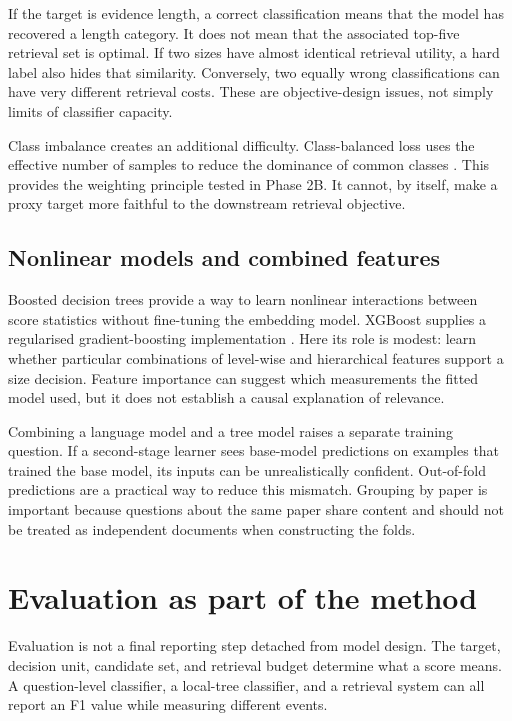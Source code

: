 If the target is evidence length, a correct classification means that
the model has recovered a length category. It does not mean that the
associated top-five retrieval set is optimal. If two sizes have almost
identical retrieval utility, a hard label also hides that similarity.
Conversely, two equally wrong classifications can have very different
retrieval costs. These are objective-design issues, not simply limits
of classifier capacity.

Class imbalance creates an additional difficulty. Class-balanced loss
uses the effective number of samples to reduce the dominance of common
classes \cite{cui2019classbalanced}. This provides the weighting
principle tested in Phase 2B. It cannot, by itself, make a proxy target
more faithful to the downstream retrieval objective.

\subsection{Nonlinear models and combined features}
Boosted decision trees provide a way to learn nonlinear interactions
between score statistics without fine-tuning the embedding model.
XGBoost supplies a regularised gradient-boosting implementation
\cite{chen2016xgboost}. Here its role is modest: learn whether particular
combinations of level-wise and hierarchical features support a size
decision. Feature importance can suggest which measurements the fitted
model used, but it does not establish a causal explanation of relevance.

Combining a language model and a tree model raises a separate training
question. If a second-stage learner sees base-model predictions on
examples that trained the base model, its inputs can be unrealistically
confident. Out-of-fold predictions are a practical way to reduce this
mismatch. Grouping by paper is important because questions about the
same paper share content and should not be treated as independent
documents when constructing the folds.

\section{Evaluation as part of the method}
Evaluation is not a final reporting step detached from model design.
The target, decision unit, candidate set, and retrieval budget determine
what a score means. A question-level classifier, a local-tree classifier,
and a retrieval system can all report an F1 value while measuring
different events.

